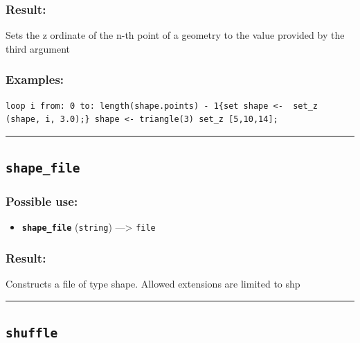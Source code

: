 \documentclass[]{book}
\providecommand{\tightlist}{%
  \setlength{\itemsep}{0pt}\setlength{\parskip}{0pt}}
\theoremstyle{definition}
\theoremstyle{definition}
\theoremstyle{definition}
\theoremstyle{remark}
\begin{document}
\subsubsection{Result:}\label{result-453}

Sets the z ordinate of the n-th point of a geometry to the value
provided by the third argument

\subsubsection{Examples:}\label{examples-326}

\begin{verbatim}
loop i from: 0 to: length(shape.points) - 1{set shape <-  set_z (shape, i, 3.0);} shape <- triangle(3) set_z [5,10,14]; 
\end{verbatim}

\begin{center}\rule{0.5\linewidth}{\linethickness}\end{center}

\subsection{\texorpdfstring{\texttt{shape\_file}}{shape\_file}}\label{shape_file}

\subsubsection{Possible use:}\label{possible-use-470}

\begin{itemize}
\tightlist
\item
  \textbf{\texttt{shape\_file}} (\texttt{string}) ---\textgreater{}
  \texttt{file}
\end{itemize}

\subsubsection{Result:}\label{result-454}

Constructs a file of type shape. Allowed extensions are limited to shp

\begin{center}\rule{0.5\linewidth}{\linethickness}\end{center}

\subsection{\texorpdfstring{\texttt{shuffle}}{shuffle}}\label{shuffle}
\end{document}
